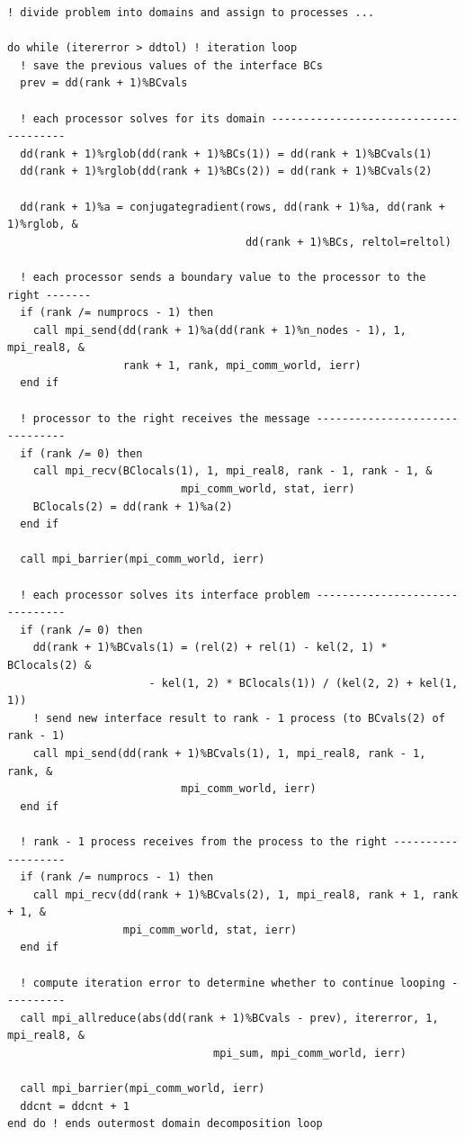 \documentclass[10pt]{article}
\begin{document}
\begin{lstlisting}
! divide problem into domains and assign to processes ...

do while (itererror > ddtol) ! iteration loop 
  ! save the previous values of the interface BCs
  prev = dd(rank + 1)%BCvals

  ! each processor solves for its domain --------------------------------------
  dd(rank + 1)%rglob(dd(rank + 1)%BCs(1)) = dd(rank + 1)%BCvals(1)
  dd(rank + 1)%rglob(dd(rank + 1)%BCs(2)) = dd(rank + 1)%BCvals(2)

  dd(rank + 1)%a = conjugategradient(rows, dd(rank + 1)%a, dd(rank + 1)%rglob, &
                                     dd(rank + 1)%BCs, reltol=reltol)

  ! each processor sends a boundary value to the processor to the right -------
  if (rank /= numprocs - 1) then
    call mpi_send(dd(rank + 1)%a(dd(rank + 1)%n_nodes - 1), 1, mpi_real8, &
                  rank + 1, rank, mpi_comm_world, ierr)
  end if

  ! processor to the right receives the message -------------------------------
  if (rank /= 0) then
    call mpi_recv(BClocals(1), 1, mpi_real8, rank - 1, rank - 1, &
                           mpi_comm_world, stat, ierr)
    BClocals(2) = dd(rank + 1)%a(2)
  end if

  call mpi_barrier(mpi_comm_world, ierr)

  ! each processor solves its interface problem -------------------------------
  if (rank /= 0) then
    dd(rank + 1)%BCvals(1) = (rel(2) + rel(1) - kel(2, 1) * BClocals(2) &
                      - kel(1, 2) * BClocals(1)) / (kel(2, 2) + kel(1, 1))
    ! send new interface result to rank - 1 process (to BCvals(2) of rank - 1)
    call mpi_send(dd(rank + 1)%BCvals(1), 1, mpi_real8, rank - 1, rank, &
                           mpi_comm_world, ierr)
  end if

  ! rank - 1 process receives from the process to the right -------------------
  if (rank /= numprocs - 1) then
    call mpi_recv(dd(rank + 1)%BCvals(2), 1, mpi_real8, rank + 1, rank + 1, &
                  mpi_comm_world, stat, ierr)
  end if

  ! compute iteration error to determine whether to continue looping ----------
  call mpi_allreduce(abs(dd(rank + 1)%BCvals - prev), itererror, 1, mpi_real8, &
                                mpi_sum, mpi_comm_world, ierr)

  call mpi_barrier(mpi_comm_world, ierr)
  ddcnt = ddcnt + 1
end do ! ends outermost domain decomposition loop
\end{lstlisting}
\end{document}
